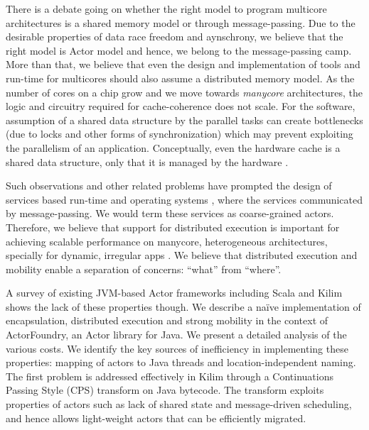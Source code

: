 There is a debate going on whether the right model to program multicore architectures is a shared memory model or through message-passing. Due to the desirable properties of data race freedom and aynschrony, we believe that the right model is Actor model and hence, we belong to the message-passing camp. More than that, we believe that even the design and implementation of tools and run-time for multicores should also assume a distributed memory model. As the number of cores on a chip grow and we move towards \emph{manycore} architectures, the logic and circuitry required for cache-coherence does not scale. For the software, assumption of a shared data structure by the parallel tasks can create bottlenecks (due to locks and other forms of synchronization) which may prevent exploiting the parallelism of an application. Conceptually, even the hardware cache is a shared data structure, only that it is managed by the hardware \cite{mit-fos}. 

Such observations and other related problems have prompted the design of services based run-time and operating systems \cite{mit-fos,singularity,servo}, where the services communicated by message-passing. We would term these services as coarse-grained actors. Therefore, we believe that support for distributed execution is important for achieving scalable performance on manycore, heterogeneous architectures, specially for dynamic, irregular apps \cite{jpdc94}. We believe that distributed execution and mobility enable a separation of concerns: ``what'' from ``where''.


A survey of existing JVM-based Actor frameworks including Scala and Kilim shows the lack of these properties though. We describe a na\"ive implementation of encapsulation, distributed execution and strong mobility in the context of ActorFoundry, an Actor library for Java. We present a detailed analysis of the various costs. We identify the key sources of inefficiency in implementing these properties: mapping of actors to Java threads and location-independent naming. The first problem is addressed effectively in Kilim \cite{srinivasan2008kit} through a Continuations Passing Style (CPS) transform on Java bytecode. The transform exploits properties of actors such as lack of shared state and message-driven scheduling, and hence allows light-weight actors that can be efficiently migrated.

